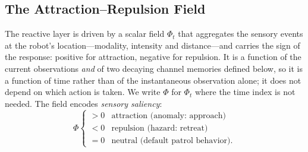 \subsection{The Attraction--Repulsion Field}
\label{sec:method-field}
The reactive layer is driven by a scalar field $\Phi_t$ that aggregates the sensory
events at the robot's location---modality, intensity and distance---and carries the
sign of the response: positive for attraction, negative for repulsion. It is a
function of the current observations \emph{and} of two decaying channel memories
defined below, so it is a function of time rather than of the instantaneous
observation alone; it does not depend on which action is taken. We write $\Phi$ for
$\Phi_t$ where the time index is not needed. The field encodes \emph{sensory saliency}:
\begin{equation}
\label{eq:phi}
\Phi
\begin{cases}
> 0 & \text{attraction (anomaly: approach)}\\
< 0 & \text{repulsion (hazard: retreat)}\\
= 0 & \text{neutral (default patrol behavior).}
\end{cases}
\end{equation}

